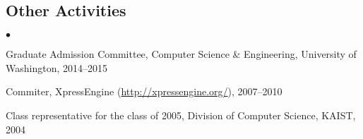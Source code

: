 \documentclass[margin,line]{res}
\newenvironment{list1}{
  \begin{list}{\ding{113}}{%
      \setlength{\itemsep}{0in}
      \setlength{\parsep}{0in} \setlength{\parskip}{0in}
      \setlength{\topsep}{0in} \setlength{\partopsep}{0in}
      \setlength{\leftmargin}{0.17in}}}{\end{list}}
\newenvironment{list2}{
  \begin{list}{$\bullet$}{%
      \setlength{\itemsep}{0in}
      \setlength{\parsep}{0in} \setlength{\parskip}{0in}
      \setlength{\topsep}{0in} \setlength{\partopsep}{0in}
      \setlength{\leftmargin}{0.2in}}}{\end{list}}
\begin{document}
\begin{resume}
\section{\sc Other Activities}
\begin{list2}
\item{Graduate Admission Committee, Computer Science \& Engineering, University of Washington, 2014--2015}
\item{Commiter, XpressEngine (\url{http://xpressengine.org/}), 2007--2010 }
\item{Class representative for the class of 2005, Division of Computer Science, KAIST, 2004}\\
\end{list2}

\end{resume}
\end{document}
